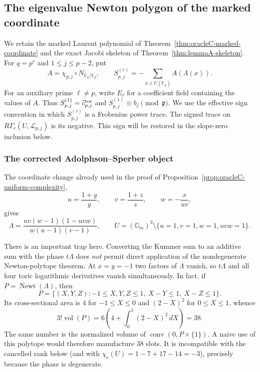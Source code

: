 
\subsection{The eigenvalue Newton polygon of the marked coordinate}
\label{ssec:lemmaBprime-result}

We retain the marked Laurent polynomial of
Theorem~\ref{thm:oracleC-marked-coordinate} and the exact Jacobi skeleton of
Theorem~\ref{thm:lemmaA-skeleton}.  For $q=p^r$ and
$1\leq j\leq p-2$, put
\[
 A=\chi_{p,j}\circ N_{\mathbb F_q/\mathbb F_p},
 \qquad
 S_{p,j}^{(r)}=-\sum_{x\in U(\mathbb F_q)}A(\Lambda(x)).
\]
For an auxiliary prime $\ell\ne p$, write $E_\ell$ for a coefficient field
containing the values of $A$.
Thus $S_{p,j}^{(1)}=\widetilde c_{p,j}^{\rm tor}$ and
$S_{p,j}^{(1)}\equiv b_j\pmod{\mathfrak p}$.  We use the effective sign
convention in which $S_{p,j}^{(r)}$ is a Frobenius power trace.  The signed
trace on $R\Gamma_c(U,\mathcal L_{p,j})$ is its negative.  This sign will be
restored in the slope-zero inclusion below.

\subsubsection{The corrected Adolphson--Sperber object}

The coordinate change already used in the proof of
Proposition~\ref{prop:oracleC-uniform-complexity},
\[
 u=\frac{1+y}{y},\qquad v=\frac{1+z}{z},\qquad
 w=-\frac{x}{uv},
\]
gives
\begin{equation}
 \Lambda=\frac{uv(w-1)(1-uvw)}{w(u-1)(v-1)},
 \qquad
 U=(\mathbb G_m)^3\setminus\{u=1,v=1,w=1,uvw=1\}.
 \label{eq:lemmaBprime-arrangement}
\end{equation}

There is an important trap here.  Converting the Kummer sum to an additive
sum with the phase $t\Lambda$ does \emph{not} permit direct application of
the nondegenerate Newton-polytope theorem.  At $x=y=-1$ two factors of
$\Lambda$ vanish, so $t\Lambda$ and all four toric logarithmic derivatives
vanish simultaneously.  In fact, if $P=\operatorname{Newt}(\Lambda)$, then
\[
 P=\{(X,Y,Z):-1\leq X,Y,Z\leq1,\ X-Y\leq1,\ X-Z\leq1\}.
\]
Its cross-sectional area is $4$ for $-1\leq X\leq0$ and $(2-X)^2$ for
$0\leq X\leq1$, whence
\begin{equation}
 3!\operatorname{vol}(P)=6\left(4+\int_0^1(2-X)^2\,dX\right)=38.
 \label{eq:lemmaBprime-wrong-volume}
\end{equation}
The same number is the normalized volume of
$\operatorname{conv}(0,P\times\{1\})$.  A naive use of this polytope would
therefore manufacture $38$ slots.  It is incompatible with the cancelled
rank below (and with $\chi_c(U)=1-7+17-14=-3$), precisely because the phase
is degenerate.

